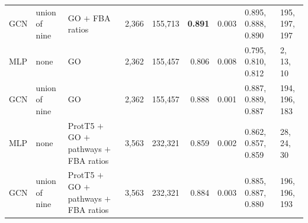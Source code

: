 \begin{table}[H]
\begin{tabular}{@{}lllrrrrll@{}}
    GCN & union of nine & GO $+$ FBA ratios & 2,366 & 155,713 & \textbf{0.891} & 0.003 & 0.895, 0.888, 0.890 & 195, 197, 197 \\
    MLP & none & GO & 2,362 & 155,457 & 0.806 & 0.008 & 0.795, 0.810, 0.812 & 2, 13, 10 \\
    GCN & union of nine & GO & 2,362 & 155,457 & 0.888 & 0.001 & 0.887, 0.889, 0.887 & 194, 196, 183 \\
    MLP & none & ProtT5 $+$ GO $+$ pathways $+$ FBA ratios & 3,563 & 232,321 & 0.859 & 0.002 & 0.862, 0.857, 0.859 & 28, 24, 30 \\
    GCN & union of nine & ProtT5 $+$ GO $+$ pathways $+$ FBA ratios & 3,563 & 232,321 & 0.884 & 0.003 & 0.885, 0.887, 0.880 & 196, 196, 193 \\
    \hline
  \end{tabular}
\end{table}
